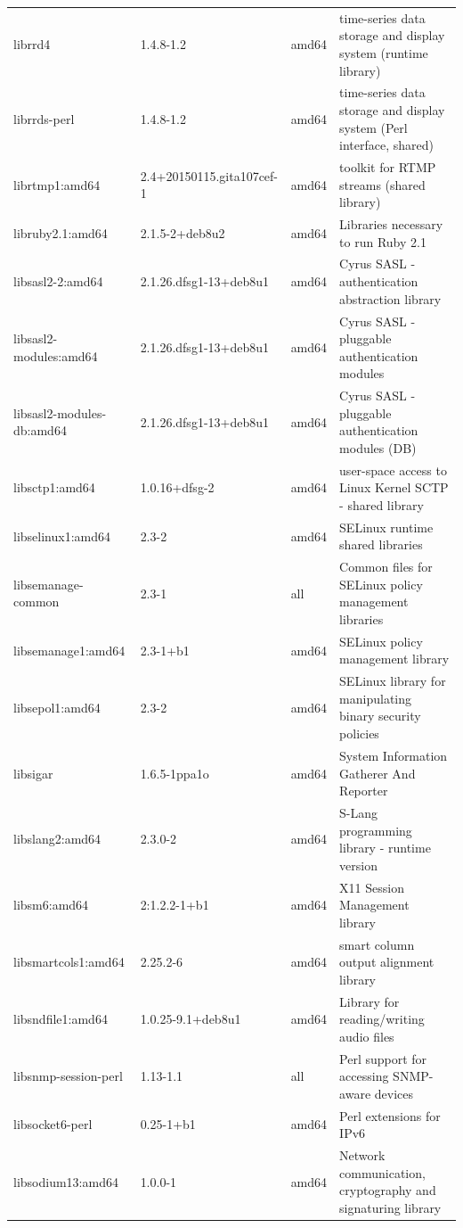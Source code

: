 \documentclass[a4paper,10pt]{article}
\begin{document}
\begin{appendices}
{\begin{longtable}{p{3.25cm}@{\hspace{0.25cm}}p{4cm}@{\hspace{0.25cm}}l@{\hspace{0.25cm}}p{7cm}}
librrd4	&	1.4.8-1.2	&	amd64	&	time-series data storage and display system (runtime library)	\\
librrds-perl	&	1.4.8-1.2	&	amd64	&	time-series data storage and display system (Perl interface, shared)	\\
librtmp1:amd64	&	2.4+20150115.gita107cef-1	&	amd64	&	toolkit for RTMP streams (shared library)	\\
libruby2.1:amd64	&	2.1.5-2+deb8u2	&	amd64	&	Libraries necessary to run Ruby 2.1	\\
libsasl2-2:amd64	&	2.1.26.dfsg1-13+deb8u1	&	amd64	&	Cyrus SASL - authentication abstraction library	\\
libsasl2-modules:amd64	&	2.1.26.dfsg1-13+deb8u1	&	amd64	&	Cyrus SASL - pluggable authentication modules	\\
libsasl2-modules-db:amd64	&	2.1.26.dfsg1-13+deb8u1	&	amd64	&	Cyrus SASL - pluggable authentication modules (DB)	\\
libsctp1:amd64	&	1.0.16+dfsg-2	&	amd64	&	user-space access to Linux Kernel SCTP - shared library	\\
libselinux1:amd64	&	2.3-2	&	amd64	&	SELinux runtime shared libraries	\\
libsemanage-common	&	2.3-1	&	all	&	Common files for SELinux policy management libraries	\\
libsemanage1:amd64	&	2.3-1+b1	&	amd64	&	SELinux policy management library	\\
libsepol1:amd64	&	2.3-2	&	amd64	&	SELinux library for manipulating binary security policies	\\
libsigar	&	1.6.5-1ppa1o	&	amd64	&	System Information Gatherer And Reporter	\\
libslang2:amd64	&	2.3.0-2	&	amd64	&	S-Lang programming library - runtime version	\\
libsm6:amd64	&	2:1.2.2-1+b1	&	amd64	&	X11 Session Management library	\\
libsmartcols1:amd64	&	2.25.2-6	&	amd64	&	smart column output alignment library	\\
libsndfile1:amd64	&	1.0.25-9.1+deb8u1	&	amd64	&	Library for reading/writing audio files	\\
libsnmp-session-perl	&	1.13-1.1	&	all	&	Perl support for accessing SNMP-aware devices	\\
libsocket6-perl	&	0.25-1+b1	&	amd64	&	Perl extensions for IPv6	\\
libsodium13:amd64	&	1.0.0-1	&	amd64	&	Network communication, cryptography and signaturing library	\\

\end{longtable}}
\end{appendices}
\end{document}
